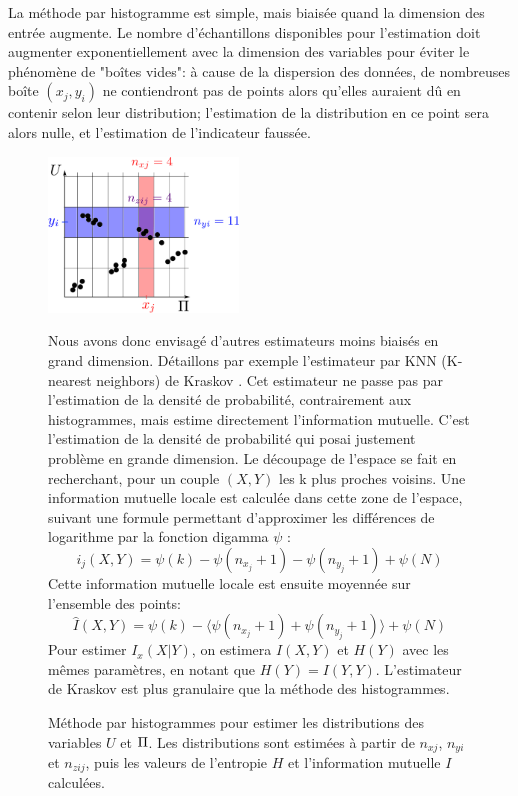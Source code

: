 La méthode par histogramme est simple, mais biaisée quand la dimension des entrée augmente.
Le nombre d'échantillons disponibles pour l'estimation doit augmenter exponentiellement avec la dimension des variables pour éviter le phénomène de "boîtes vides": à cause de la dispersion des données, de nombreuses boîte $(x_j,y_i)$ ne contiendront pas de points alors qu'elles auraient dû en contenir selon leur distribution; l'estimation de la distribution en ce point sera alors nulle, et l'estimation de l'indicateur faussée.
\begin{figure}
\centering
\includegraphics[width=0.45\textwidth]{boxes}
\caption{Méthode par histogrammes pour estimer les distributions des variables $U$ et $\Pi$. Les distributions sont estimées à partir de $n_{xj}$, $n_{yi}$ et $n_{zij}$, puis les valeurs de l'entropie $H$ et l'information mutuelle $I$ calculées.}
\label{fig:binning}



Nous avons donc envisagé d'autres estimateurs moins biaisés en grand dimension. Détaillons par exemple l'estimateur par KNN (K-nearest neighbors) de Kraskov \cite{2004kraskov}. 
Cet estimateur ne passe pas par l'estimation de la densité de probabilité, contrairement aux histogrammes, mais estime directement l'information mutuelle. C'est l'estimation de la densité de probabilité qui posai justement problème en grande dimension.
Le découpage de l'espace se fait en recherchant, pour un couple $(X,Y)$ les k plus proches voisins. Une information mutuelle locale est calculée dans cette zone de l'espace, suivant une formule permettant d'approximer les différences de logarithme par la fonction digamma $\psi$ : 
$$i_j(X,Y) = \psi(k) - \psi(n_{x_j} + 1) - \psi(n_{y_j} +1) + \psi(N)$$
Cette information mutuelle locale est ensuite moyennée sur l'ensemble des points: 
$$\hat{I}(X,Y) = \psi(k) - \langle\psi(n_{x_j} + 1) + \psi(n_{y_j} +1)\rangle + \psi(N)$$
Pour estimer $I_x(X|Y)$, on estimera $I(X,Y)$ et $H(Y)$ avec les mêmes paramètres, en notant que $H(Y) = I(Y,Y)$.
L'estimateur de Kraskov est plus granulaire que la méthode des histogrammes. 

\end{figure}


